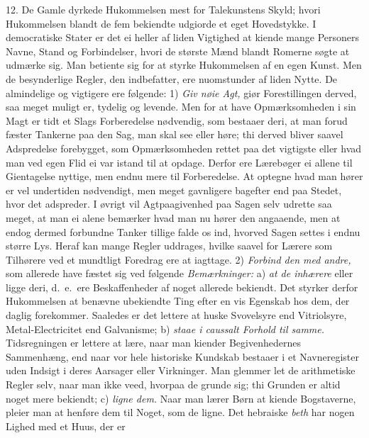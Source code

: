 \documentclass[12pt,a4paper]{article}
\newcommand{\opage}[1]{\marginnote{\footnotesize\textit{[#1]}}}
\begin{document}
\opage{114} 12. De Gamle dyrkede Hukommelsen mest for Talekunstens Skyld; hvori Hukommelsen blandt de
fem bekiendte udgiorde et eget Hovedstykke. I democratiske Stater er det ei heller af
liden Vigtighed at kiende mange Personers Navne, Stand og Forbindelser, hvori de største
Mænd blandt Romerne søgte at udmærke sig. Man betiente sig for at styrke Hukommelsen af
en egen Kunst. Men de besynderlige Regler, den indbefatter, ere nuomstunder af liden
Nytte. De almindelige og vigtigere ere følgende: 1) \emph{Giv nøie Agt,} giør
Forestillingen derved, saa meget muligt er, tydelig og levende. Men for at have
Opmærksomheden i sin Magt er tidt et Slags Forberedelse nødvendig, som bestaaer deri, at
man forud fæster Tankerne paa den Sag, man skal see eller høre; thi derved bliver saavel
Adspredelse forebygget, som Opmærksomheden rettet paa det vigtigste eller hvad man ved
egen Flid ei var istand til at opdage. Derfor ere Lærebøger ei allene til Gientagelse
nyttige, men endnu mere til Forberedelse. At optegne hvad man hører er vel undertiden
nødvendigt, men meget gavnligere bagefter end paa Stedet, hvor det adspreder. I øvrigt vil
Agtpaagivenhed paa Sagen selv udrette saa meget, at man ei alene bemærker hvad man nu
hører den angaaende, men at endog dermed forbundne Tanker tillige falde os ind, hvorved
Sagen settes i endnu større Lys. Heraf kan mange Regler uddrages,
\opage{115} hvilke saavel for Lærere som Tilhørere ved et mundtligt Foredrag ere at iagttage.
2) \emph{Forbind den med andre,} som allerede have fæstet sig ved følgende
\emph{Bemærkninger:} a) \emph{at de inhærere} eller ligge deri, d.~e.\ ere Beskaffenheder
af noget allerede bekiendt. Det styrker derfor Hukommelsen at benævne ubekiendte Ting
efter en vis Egenskab hos dem, der daglig forekommer. Saaledes er det lettere at huske
Svovelsyre end Vitriolsyre, Metal-Electricitet end Galvanisme; b) \emph{staae i caussalt
Forhold til samme.} Tidsregningen er lettere at lære, naar man kiender Begivenhedernes
Sammenhæng, end naar vor hele historiske Kundskab bestaaer i et Navneregister uden
Indsigt i deres Aarsager eller Virkninger. Man glemmer let de arithmetiske Regler selv,
naar man ikke veed, hvorpaa de grunde sig; thi Grunden er altid noget mere bekiendt;
c) \emph{ligne dem.} Naar man lærer Børn at kiende Bogstaverne, pleier man at henføre dem
til Noget, som de ligne. Det hebraiske \emph{beth} har nogen Lighed med et Huus, der er
\end{document}
